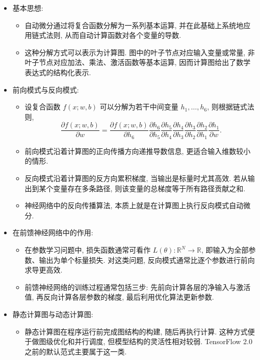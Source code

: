 \documentclass{../nndlcourse}
\begin{document}
\begin{itemize}
    \item 基本思想:
    \begin{itemize}
        \item 自动微分通过将复合函数分解为一系列基本运算, 并在此基础上系统地应用链式法则, 从而自动计算函数对各个变量的导数. 
        \item 这种分解方式可以表示为计算图. 图中的叶子节点对应输入变量或常量, 非叶子节点对应加法、乘法、激活函数等基本运算, 因而计算图给出了数学表达式的结构化表示. 
    \end{itemize}
    \item 前向模式与反向模式:
    \begin{itemize}
        \item 设复合函数 $f(x; w, b)$ 可以分解为若干中间变量 $h_1, \dots, h_6$, 则根据链式法则,
        \begin{equation*}
            \frac{\partial f(x; w, b)}{\partial w} = \frac{\partial f(x; w, b)}{\partial h_6} \frac{\partial h_6}{\partial h_5} \frac{\partial h_5}{\partial h_4} \frac{\partial h_4}{\partial h_3} \frac{\partial h_3}{\partial h_2} \frac{\partial h_2}{\partial h_1} \frac{\partial h_1}{\partial w}.
        \end{equation*}
        \item 前向模式沿着计算图的正向传播方向递推导数信息, 更适合输入维数较小的情形. 
        \item 反向模式沿着计算图的反方向累积梯度, 当输出是标量时尤其高效. 若从输出到某个变量存在多条路径, 则该变量的总梯度等于所有路径贡献之和. 
        \item 神经网络中的反向传播算法, 本质上就是在计算图上执行反向模式自动微分. 
    \end{itemize}
    \item 在前馈神经网络中的作用:
    \begin{itemize}
        \item 在参数学习问题中, 损失函数通常可看作 $L(\theta): \mathbb{R}^N \to \mathbb{R}$, 即输入为全部参数、输出为单个标量损失. 对这类问题, 反向模式通常比逐个参数进行前向求导更高效. 
        \item 前馈神经网络的训练过程通常包括三步: 先前向计算各层的净输入与激活值, 再反向计算各层参数的梯度, 最后利用优化算法更新参数. 
    \end{itemize}
    \item 静态计算图与动态计算图:
    \begin{itemize}
        \item 静态计算图在程序运行前完成图结构的构建, 随后再执行计算. 这种方式便于做图级优化和并行调度, 但模型结构的灵活性相对较弱. TensorFlow 2.0 之前的默认范式主要属于这一类. 

\end{itemize}
\end{itemize}
\end{document}
